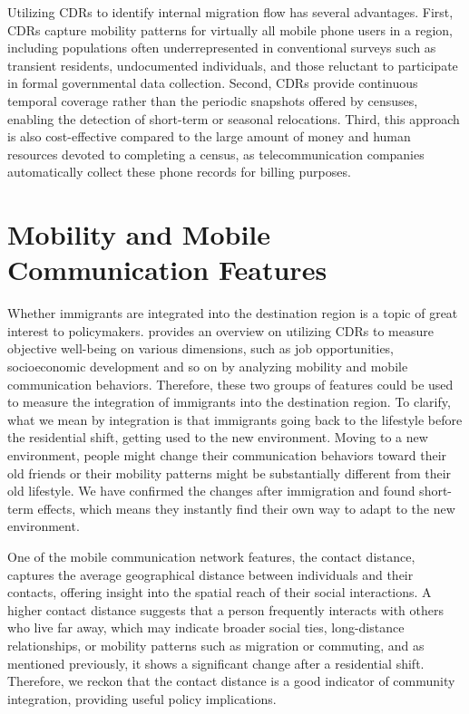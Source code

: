 Utilizing CDRs to identify internal migration flow has several advantages. First, CDRs capture mobility patterns for virtually all mobile phone users in a region, including populations often underrepresented in conventional surveys such as transient residents, undocumented individuals, and those reluctant to participate in formal governmental data collection. Second, CDRs provide continuous temporal coverage rather than the periodic snapshots offered by censuses, enabling the detection of short-term or seasonal relocations. Third, this approach is also cost-effective compared to the large amount of money and human resources devoted to completing a census, as telecommunication companies automatically collect these phone records for billing purposes.




\section{Mobility and Mobile Communication Features}
Whether immigrants are integrated into the destination region is a topic of great interest to policymakers. \cite{voukelatou2021measuring} provides an overview on utilizing CDRs to measure objective well-being on various dimensions, such as job opportunities, socioeconomic development and so on by analyzing mobility and mobile communication behaviors. Therefore, these two groups of features could be used to measure the integration of immigrants into the destination region. To clarify, what we mean by integration is that immigrants going back to the lifestyle before the residential shift, getting used to the new environment. Moving to a new environment, people might change their communication behaviors toward their old friends or their mobility patterns might be substantially different from their old lifestyle. We have confirmed the changes after immigration and found short-term effects, which means they instantly find their own way to adapt to the new environment.


One of the mobile communication network features, the contact distance, captures the average geographical distance between individuals and their contacts, offering insight into the spatial reach of their social interactions.
A higher contact distance suggests that a person frequently interacts with others who live far away, which may indicate broader social ties, long-distance relationships, or mobility patterns such as migration or commuting, and as mentioned previously, it shows a significant change after a residential shift.
Therefore, we reckon that the contact distance is a good indicator of community integration, providing useful policy implications.

